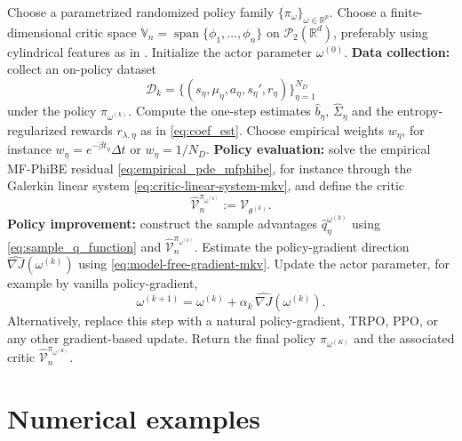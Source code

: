 \documentclass[a4paper, 10pt, english, reqno]{amsart}
\begin{document}
\begin{algorithm}[H]
\caption{Model-free actor-critic iteration based on MF-PhiBE}
\label{alg:model-free-mfphibe-actor-critic}
\begin{algorithmic}[1]
\State Choose a parametrized randomized policy family
$\{\pi_\omega\}_{\omega\in\mathbb R^p}$.
\State Choose a finite-dimensional critic space
$\mathbb V_n=\operatorname{span}\{\phi_1,\dots,\phi_n\}$ on
$\mathcal P_2(\mathbb R^d)$, preferably using cylindrical features as in
.
\State Initialize the actor parameter $\omega^{(0)}$.
    \State \textbf{Data collection:}
    collect an on-policy dataset
    \[
    \mathcal D_k
    =
    \bigl\{
    (s_\eta,\mu_\eta,a_\eta,s_\eta',r_\eta)
    \bigr\}_{\eta=1}^{N_D}
    \]
    under the policy $\pi_{\omega^{(k)}}$.
    \State Compute the one-step estimates
    $\widehat b_\eta$, $\widehat\Sigma_\eta$ and the
    entropy-regularized rewards $r_{\lambda,\eta}$ as in
    \eqref{eq:coef_est}.
    \State Choose empirical weights $w_\eta$, for instance
    $w_\eta=e^{-\beta t_\eta}\Delta t$ or
    $w_\eta=1/N_D$.
    \State \textbf{Policy evaluation:}
    solve the empirical MF-PhiBE residual \eqref{eq:empirical_pde_mfphibe}, for instance through the Galerkin linear system \eqref{eq:critic-linear-system-mkv}, and define the critic
    \[
    \hat{\mathcal V}^{\pi_{\omega^{(k)}}}_n
    :=
    \mathcal V_{\theta^{(k)}}.
    \]
    \State \textbf{Policy improvement:}
    construct the sample advantages
    $\widehat q_\eta^{\omega^{(k)}}$ using \eqref{eq:sample_q_function} and
    $\hat{\mathcal V}^{\pi_{\omega^{(k)}}}_n$.
    \State Estimate the policy-gradient direction
    $\widehat{\nabla J}(\omega^{(k)})$ using
    \eqref{eq:model-free-gradient-mkv}.
    \State Update the actor parameter, for example by vanilla policy-gradient,
    \[
    \omega^{(k+1)}
    =
    \omega^{(k)}
    +
    \alpha_k\,\widehat{\nabla J}(\omega^{(k)}).
    \]
    Alternatively, replace this step with a natural policy-gradient, TRPO, PPO, or any other gradient-based update.
\EndFor
\State Return the final policy $\pi_{\omega^{(K)}}$ and the associated
critic $\hat{\mathcal V}^{\pi_{\omega^{(K)}}}_n$.
\end{algorithmic}
\end{algorithm}




\section{Numerical examples}\label{sec:numerics}
\end{document}
